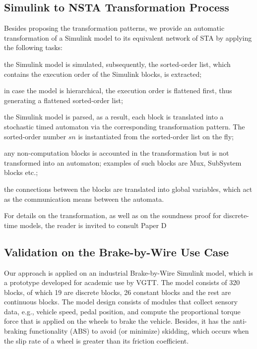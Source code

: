 \subsection*{Simulink to NSTA Transformation Process} 
Besides proposing the transformation patterns, we provide an automatic transformation of a Simulink model to its equivalent network of STA by applying the following tasks:
\begin{enumerate*}[label=(\roman*)]
	\item the Simulink model is simulated, subsequently, the sorted-order list, which contains the execution order of the Simulink blocks, is extracted;
	\item in case the model is hierarchical, the execution order is flattened first, thus generating a flattened sorted-order list;
	\item the Simulink model is parsed, as a result, each block is translated into a stochastic timed automaton via the corresponding transformation pattern. The sorted-order number $sn$ is instantiated from the sorted-order list on the fly;
	\item any non-computation blocks is accounted in the transformation but is not transformed into an automaton; examples of such blocks are Mux, SubSystem blocks etc.;
	\item the connections between the blocks are translated into global variables, which act as the communication means between the automata.
\end{enumerate*}
For details on the transformation, as well as on the soundness proof for discrete-time models, the reader is invited to consult Paper D~\cite{Filipovikj2018SimppaalModels}


\subsection*{Validation on the Brake-by-Wire Use Case} 
Our approach is applied on an industrial Brake-by-Wire Simulink model, which is a prototype developed for academic use by VGTT. The model consists of 320 blocks, of which 19 are discrete blocks, 26 constant blocks and the rest are continuous blocks. The model design consists of modules that collect sensory data, e.g., vehicle speed, pedal position, and compute the proportional torque force that is applied on the wheels to brake the vehicle. Besides, it has the  anti-braking functionality (ABS) to avoid (or minimize) skidding, which occurs when the slip rate of a wheel is greater than its friction coefficient. 

